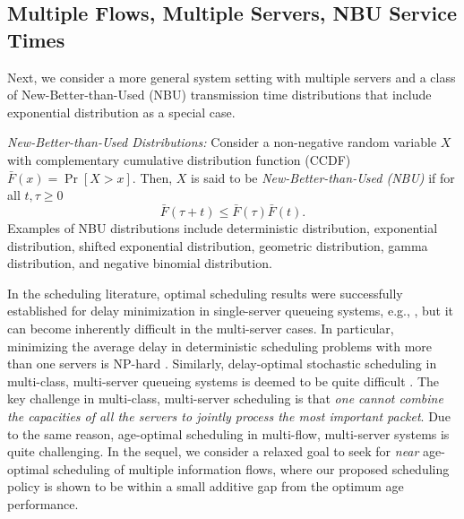 \subsection{Multiple Flows, Multiple Servers, NBU Service Times}
Next, we consider a more general system setting with multiple servers and a class of New-Better-than-Used (NBU)  transmission time distributions that include exponential distribution as a special case. 

\begin{definition}  \emph{New-Better-than-Used Distributions:} Consider a non-negative random variable $X$ with complementary cumulative distribution function (CCDF) $\bar{F}(x)=\Pr[X>x]$. Then, $X$ is said to be \emph{New-Better-than-Used (NBU)} if for all $t,\tau\geq0$
\begin{equation}\label{NBU_Inequality}
\bar{F}(\tau +t)\leq \bar{F}(\tau)\bar{F}(t).
\end{equation} 
Examples of NBU distributions include deterministic distribution, exponential distribution, shifted exponential distribution, geometric distribution, gamma distribution, and negative binomial distribution. 
\end{definition}


In the scheduling literature, optimal  scheduling results were successfully established for delay minimization in single-server queueing systems, e.g., \cite{Schrage68,Jackson55}, but it can become inherently difficult in the multi-server cases. In particular, minimizing the average delay in deterministic scheduling problems with more than one servers is NP-hard  \cite{Leonardi:1997}. Similarly, delay-optimal stochastic scheduling in multi-class, multi-server queueing systems is deemed to be quite difficult \cite{Weiss:1992,Weiss:1995,Dacre1999}. The key challenge in multi-class, multi-server scheduling is that \emph{one cannot combine the capacities of all the servers to jointly process the most important packet}. Due to the same reason, age-optimal scheduling in multi-flow, multi-server systems is quite challenging. In the sequel, we consider a  relaxed goal to seek for \emph{near} age-optimal scheduling of multiple information flows, where our proposed scheduling policy is shown to be within a small additive gap from the optimum age performance.   

